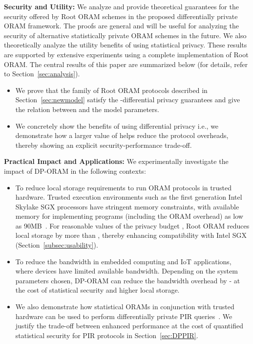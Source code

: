 \documentclass[USenglish,oneside,twocolumn]{article}
\newcommand{\ourprotocol}{Root ORAM}
\begin{document}
\textbf{Security and Utility: }We analyze and provide theoretical guarantees for 
the security offered by \ourprotocol{} schemes in the proposed differentially private 
ORAM framework. The proofs are general and will be useful for analyzing 
the security of alternative statistically private ORAM schemes in the future. 
We also theoretically analyze the utility benefits of using statistical privacy. 
These results are supported by extensive experiments using a complete implementation 
of \ourprotocol{}. The central results of this paper are summarized below (for details, refer to Section~\ref{sec:analysis}). 
\vspace{-6pt} 
\begin{itemize}
\itemsep0em
\item We prove that the family of \ourprotocol{} protocols 
described in Section~\ref{sec:newmodel} satisfy the -differential 
privacy guarantees and give the relation between  and the model parameters.
\item We concretely show the benefits of using differential privacy i.e., we demonstrate 
how a larger value of  helps reduce the protocol overheads, thereby showing 
an explicit security-performance trade-off.
\end{itemize}
\vspace{-6pt} 


\textbf{Practical Impact and Applications:} We experimentally investigate the impact of DP-ORAM in the following contexts:
\vspace{-6pt} 
\begin{itemize}
\itemsep0em
\item To reduce local storage requirements to run ORAM protocols 
in trusted hardware. Trusted execution environments such as the first 
generation Intel Skylake SGX processors have stringent memory constraints, 
with available memory for implementing programs (including the ORAM overhead) as low as 90MB~\cite{ohrimenko2016oblivious}. 
For reasonable values of the privacy budget , \ourprotocol{} reduces 
local storage by more than , thereby enhancing compatibility with Intel SGX (Section~\ref{subsec:usability}).
\item To reduce the bandwidth in embedded computing and IoT applications, 
where devices have limited available bandwidth. Depending on the system 
parameters chosen, DP-ORAM can reduce the bandwidth overhead by - at 
the cost of statistical security and higher local storage. 
\item We also demonstrate how statistical ORAMs in conjunction with trusted 
hardware can be used to perform differentially private PIR queries~\cite{goldbergDPPIR}. 
We justify the trade-off between enhanced performance at the cost of 
quantified statistical security for PIR protocols in Section~\ref{sec:DPPIR}.
\end{itemize}
\vspace{-6pt} 
\end{document}
